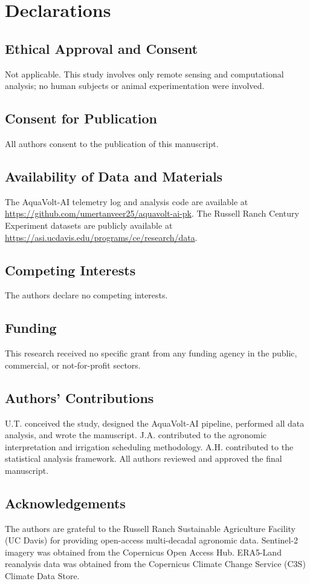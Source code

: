\documentclass[review,12pt]{elsarticle}
\begin{document}
\section*{Declarations}

\subsection*{Ethical Approval and Consent}
Not applicable. This study involves only remote sensing and computational analysis; no human subjects or animal experimentation were involved.

\subsection*{Consent for Publication}
All authors consent to the publication of this manuscript.

\subsection*{Availability of Data and Materials}
The AquaVolt-AI telemetry log and analysis code are available at \url{https://github.com/umertanveer25/aquavolt-ai-pk}. The Russell Ranch Century Experiment datasets are publicly available at \url{https://asi.ucdavis.edu/programs/ce/research/data}.

\subsection*{Competing Interests}
The authors declare no competing interests.

\subsection*{Funding}
This research received no specific grant from any funding agency in the public, commercial, or not-for-profit sectors.

\subsection*{Authors' Contributions}
U.T. conceived the study, designed the AquaVolt-AI pipeline, performed all data analysis, and wrote the manuscript. J.A. contributed to the agronomic interpretation and irrigation scheduling methodology. A.H. contributed to the statistical analysis framework. All authors reviewed and approved the final manuscript.

\subsection*{Acknowledgements}
The authors are grateful to the Russell Ranch Sustainable Agriculture Facility (UC Davis) for providing open-access multi-decadal agronomic data. Sentinel-2 imagery was obtained from the Copernicus Open Access Hub. ERA5-Land reanalysis data was obtained from the Copernicus Climate Change Service (C3S) Climate Data Store.



\end{document}
